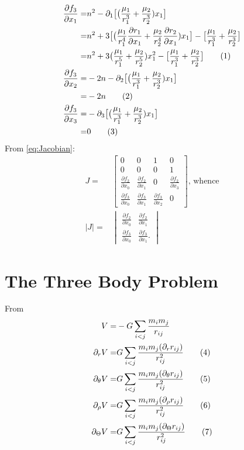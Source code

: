 \documentclass[]{article}
\newcommand\numberthis{\addtocounter{equation}{1}\tag{\theequation}}
\begin{document}
\begin{align*}
	\frac{\partial f_3}{\partial x_1} =& n^2- \partial_1\big[\big(\frac{\mu_1}{r_1^3} + \frac{\mu_2}{r_2^3})x_1\big]\\
	=& n^2  + 3 \big[\big(\frac{\mu_1}{r_1^4}\frac{\partial r_1}{\partial x_1} + \frac{\mu_2}{r_2^4}\frac{\partial r_2}{\partial x_1})x_1\big] - \big[\frac{\mu_1}{r_1^3} + \frac{\mu_2}{r_2^3}\big]\\
	=& n^2  + 3 \big(\frac{\mu_1}{r_1^5} + \frac{\mu_2}{r_2^5})x_1^2 - \big[\frac{\mu_1}{r_1^3} + \frac{\mu_2}{r_2^3}\big] \numberthis \label{eq:J31}\\
	\frac{\partial f_3}{\partial x_2} =& -2n - \partial_2\big[\big(\frac{\mu_1}{r_1^3} + \frac{\mu_2}{r_2^3})x_1\big]\\
	=& -2n \numberthis \label{eq:J32}\\
	\frac{\partial f_3}{\partial x_3} =& - \partial_3\big[\big(\frac{\mu_1}{r_1^3} + \frac{\mu_2}{r_2^3})x_1\big]\\
	=& 0 \numberthis \label{eq:J33}
\end{align*}
From \ref{eq:Jacobian}:
\begin{align*}
		J =& \begin{bmatrix}
		0&0&1&0\\
		0&0&0&1\\
		\frac{\partial f_2}{\partial x_0}&\frac{\partial f_2}{\partial x_1}&0&\frac{\partial f_2}{\partial x_3}\\
		\frac{\partial f_3}{\partial x_0}&\frac{\partial f_3}{\partial x_1}&\frac{\partial f_3}{\partial x_2}&0
	\end{bmatrix} \text{, whence}\\
	\vert J \vert =& \begin{vmatrix} 
		\frac{\partial f_2}{\partial x_0}&\frac{\partial f_2}{\partial x_1} \\ 
		\frac{\partial f_3}{\partial x_0}&\frac{\partial f_3}{\partial x_1}.
	\end{vmatrix}
\end{align*}
\section {The Three Body Problem}

From \cite[(24)]{kotovych2002exactly}
\begin{align*}
	V =& -G \sum_{i<j}\frac{m_i m_j}{r_{ij}}\\
	\partial_r V =& G \sum_{i<j}\frac{m_i m_j(\partial_r r_{ij})}{r_{ij}^2} \numberthis \label{eq:V:r}\\
	\partial_{\theta} V =& G \sum_{i<j}\frac{m_i m_j(\partial_{\theta} r_{ij})}{r_{ij}^2}  \numberthis \label{eq:V:theta}\\
	\partial_{\rho} V =& G \sum_{i<j}\frac{m_i m_j(\partial_{\rho} r_{ij})}{r_{ij}^2} \numberthis \label{eq:V:rho}\\
	\partial_{\Theta} V =& G \sum_{i<j}\frac{m_i m_j(\partial_{\Theta} r_{ij})}{r_{ij}^2}  \numberthis \label{eq:V:Theta}
\end{align*}
\end{document}
